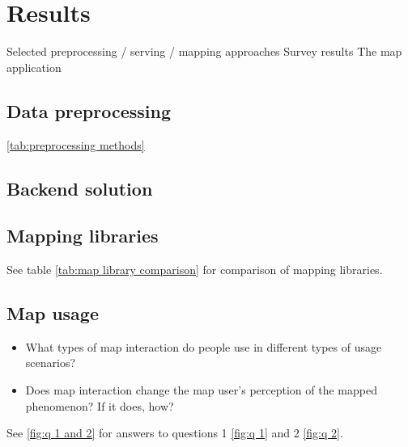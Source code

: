 \section{Results}
Selected preprocessing / serving / mapping approaches
Survey results
The map application

\subsection{Data preprocessing}

\ref{tab:preprocessing methods}



\subsection{Backend solution}

\subsection{Mapping libraries}


See table \ref{tab:map library comparison} for comparison of mapping libraries.


\subsection{Map usage}

\begin{itemize}
	\item What types of map interaction do people use
	in different types of usage scenarios?
	\item Does map interaction change
	the map user's perception of the mapped phenomenon? If it does, how?
\end{itemize}

See \ref{fig:q 1 and 2} for answers to questions 1 \ref{fig:q 1} and 2 \ref{fig:q 2}.

